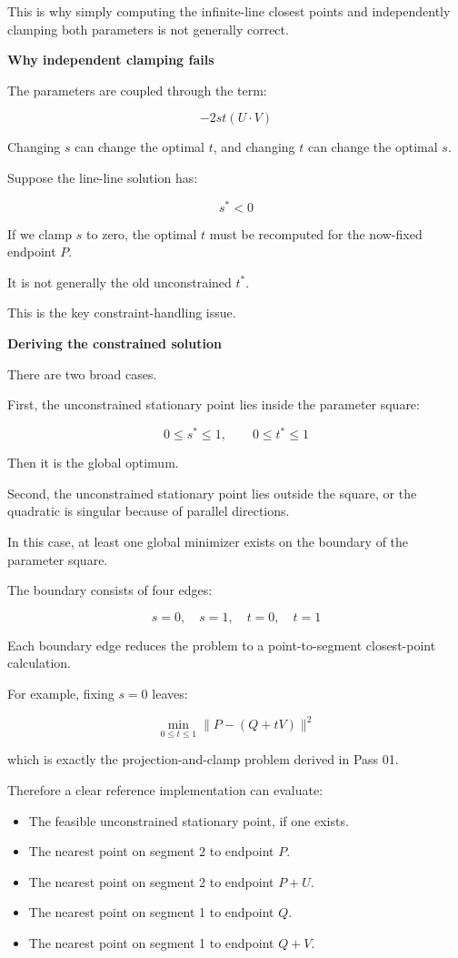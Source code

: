 This is why simply computing the infinite-line closest points and independently clamping both parameters is not generally correct.

\textbf{Why independent clamping fails}

The parameters are coupled through the term:

\[
-2st(U\cdot V)
\]

Changing \(s\) can change the optimal \(t\), and changing \(t\) can change the optimal \(s\).

Suppose the line-line solution has:

\[
s^*<0
\]

If we clamp \(s\) to zero, the optimal \(t\) must be recomputed for the now-fixed endpoint \(P\).

It is not generally the old unconstrained \(t^*\).

This is the key constraint-handling issue.

\textbf{Deriving the constrained solution}

There are two broad cases.

First, the unconstrained stationary point lies inside the parameter square:

\[
0\le s^*\le1,\qquad0\le t^*\le1
\]

Then it is the global optimum.

Second, the unconstrained stationary point lies outside the square, or the quadratic is singular because of parallel directions.

In this case, at least one global minimizer exists on the boundary of the parameter square.

The boundary consists of four edges:

\[
s=0,\quad s=1,\quad t=0,\quad t=1
\]

Each boundary edge reduces the problem to a point-to-segment closest-point calculation.

For example, fixing \(s=0\) leaves:

\[
\min_{0\le t\le1}\|P-(Q+tV)\|^2
\]

which is exactly the projection-and-clamp problem derived in Pass 01.

Therefore a clear reference implementation can evaluate:

\begin{itemize}
\tightlist
\item
  The feasible unconstrained stationary point, if one exists.
\item
  The nearest point on segment 2 to endpoint \(P\).
\item
  The nearest point on segment 2 to endpoint \(P+U\).
\item
  The nearest point on segment 1 to endpoint \(Q\).
\item
  The nearest point on segment 1 to endpoint \(Q+V\).
\end{itemize}

